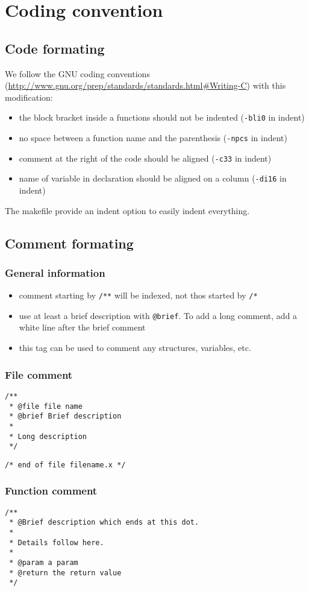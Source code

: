 \chapter{Coding convention}

\section{Code formating}
We follow the GNU coding conventions (\url{http://www.gnu.org/prep/standards/standards.html#Writing-C}) with this modification:
\begin{itemize}
  \item the block bracket inside a functions should not be indented (\verb+-bli0+ in indent)
  \item no space between a function name and the parenthesis (\verb+-npcs+ in indent)
  \item comment at the right of the code should be aligned (\verb+-c33+ in indent)
  \item name of variable in declaration should be aligned on a column (\verb+-di16+ in indent)
\end{itemize}

The makefile provide an indent option to easily indent everything.

\section{Comment formating}

\subsection{General information}

\begin{itemize}
  \item comment starting by \verb+/**+ will be indexed, not thos started by \verb+/*+
  \item use at least a brief description with \verb+@brief+. To add a long comment, add a white line after the brief comment
  \item this tag can be used to comment any structures, variables, etc.
\end{itemize}

\subsection{File comment}

\begin{verbatim}
/**
 * @file file name
 * @brief Brief description
 *
 * Long description
 */
\end{verbatim}

\begin{verbatim}
/* end of file filename.x */
\end{verbatim}

\subsection{Function comment}

\begin{verbatim}
/**
 * @Brief description which ends at this dot.
 *
 * Details follow here.
 *
 * @param a param
 * @return the return value
 */
\end{verbatim}

